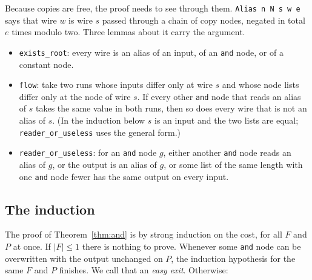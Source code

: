 \documentclass[11pt]{amsart}
\theoremstyle{definition}
\theoremstyle{remark}
\newcommand{\lean}[1]{\texttt{#1}}
\begin{document}
Because copies are free, the proof needs to see through them. \lean{Alias n N s w e} says
that wire $w$ is wire $s$ passed through a chain of copy nodes, negated in total $e$ times
modulo two. Three lemmas about it carry the argument.
\begin{itemize}
\item \lean{exists\_root}: every wire is an alias of an input, of an \lean{and} node, or of
  a constant node.
\item \lean{flow}: take two runs whose inputs differ only at wire $s$ and whose node lists
  differ only at the node of wire $s$. If every other \lean{and} node that reads an alias of
  $s$ takes the same value in both runs, then so does every wire that is not an alias of $s$.
  (In the induction below $s$ is an input and the two lists are equal;
  \lean{reader\_or\_useless} uses the general form.)
\item \lean{reader\_or\_useless}: for an \lean{and} node $g$, either another \lean{and} node
  reads an alias of $g$, or the output is an alias of $g$, or some list of the same length with one \lean{and}
  node fewer has the same output on every input.
\end{itemize}

\subsection{The induction}
The proof of Theorem~\ref{thm:and} is by strong induction on the cost, for all $F$ and $P$ at
once. If $|F|\le 1$ there is nothing to prove. Whenever some \lean{and} node can be overwritten
with the output unchanged on $P$, the induction hypothesis for the same $F$ and $P$ finishes.
We call that an \emph{easy exit}. Otherwise:
\end{document}
